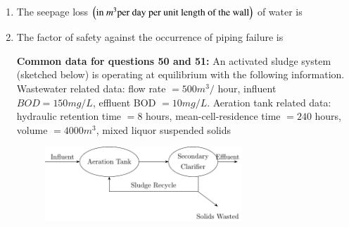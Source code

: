 \documentclass[journal]{IEEEtran}
\begin{document}
\begin{enumerate}
	\item  The seepage loss $\left(\text{in } m^{3} \text{per day per unit length of the wall}\right)$ of water is
		\begin{enumerate}
        	\end{enumerate}	
	\item The factor of safety against the occurrence of piping failure is
                \begin{enumerate}
         \end{enumerate}		
\textbf{Common data for questions 50 and 51:}
       An activated sludge system (sketched below) is operating at equilibrium with the following information. Wastewater related data: flow rate $=500 m^{3} /$ hour, influent $BOD=150 mg / L$, effluent BOD $=10 mg / L$. Aeration tank related data: hydraulic retention time $=8$ hours, mean-cell-residence time $=240$ hours, volume $=4000 m^{3}$, mixed liquor suspended solids 
       \begin{figure}[h!]
    \centering
    \includegraphics[width=0.7\textwidth]{fig/fig2.pdf}
\end{figure}
       

\end{enumerate}
\end{document}
